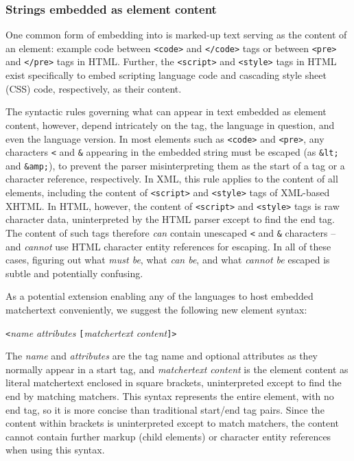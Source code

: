 \subsubsection{Strings embedded as element content}
\label{sec:host:ml:element}

One common form of embedding into \ml 
is marked-up text serving as the content of an element:
\eg example code between \verb|<code>| and \verb|</code>| tags
or between \verb|<pre>| and \verb|</pre>| tags in HTML.
Further, the \verb|<script>| and \verb|<style>| tags in HTML
exist specifically to embed scripting language code
and cascading style sheet (CSS) code, respectively,
as their content.

The syntactic rules governing
what can appear in text embedded as element content,
however,
depend intricately on the tag, the \ml language in question,
and even the language version.
In most elements such as \verb|<code>| and \verb|<pre>|,
any characters \verb|<| and \verb|&| appearing in the embedded string
must be escaped (as \verb|&lt;| and \verb|&amp;|),
to prevent the \ml parser misinterpreting them as
the start of a tag or a character reference,
respectively.
In XML, this rule applies to the content of all elements,
including the content of \verb|<script>| and \verb|<style>| tags
of XML-based XHTML.
In HTML, however, the content of \verb|<script>| and \verb|<style>| tags
is raw character data,
uninterpreted by the HTML parser except to find the end tag.
The content of such tags therefore \emph{can} contain
unescaped \verb|<| and \verb|&| characters --
and \emph{cannot} use HTML character entity references for escaping.
In all of these cases, figuring out what \emph{must be},
what \emph{can be}, and what \emph{cannot be}
escaped is subtle and potentially confusing.

As a potential extension enabling any of the \ml languages
to host embedded matchertext conveniently,
we suggest the following new element syntax:

\begin{center}
\verb|<|\emph{name attributes }\verb|[|\emph{matchertext content}\verb|]>|
\end{center}

The \emph{name} and \emph{attributes} are the tag name and optional attributes
as they normally appear in a start tag,
and \emph{matchertext content} is the element content as literal matchertext
enclosed in square brackets,
uninterpreted except to find the end by matching matchers.
This syntax represents the entire element,
with no end tag,
so it is more concise than traditional start/end tag pairs.
Since the content within brackets is uninterpreted except to match matchers,
the content cannot contain further markup (child elements)
or \ml character entity references when using this syntax.

